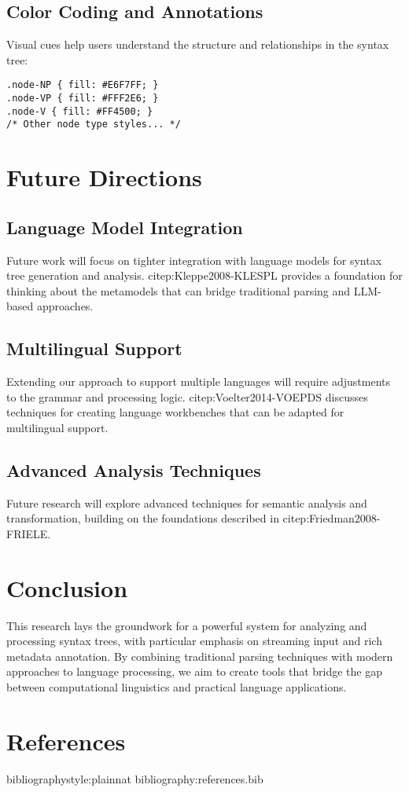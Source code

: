 \documentclass[a4paper,11pt]{article}
\begin{document}
\subsection{Color Coding and Annotations}
\label{sec:org38556ca}

Visual cues help users understand the structure and relationships in the syntax tree:

\begin{verbatim}
.node-NP { fill: #E6F7FF; }
.node-VP { fill: #FFF2E6; }
.node-V { fill: #FF4500; }
/* Other node type styles... */
\end{verbatim}
\section{Future Directions}
\label{sec:org8c8660e}

\subsection{Language Model Integration}
\label{sec:org98bf440}

Future work will focus on tighter integration with language models for syntax tree generation and analysis. citep:Kleppe2008-KLESPL provides a foundation for thinking about the metamodels that can bridge traditional parsing and LLM-based approaches.
\subsection{Multilingual Support}
\label{sec:orgd78245a}

Extending our approach to support multiple languages will require adjustments to the grammar and processing logic. citep:Voelter2014-VOEPDS discusses techniques for creating language workbenches that can be adapted for multilingual support.
\subsection{Advanced Analysis Techniques}
\label{sec:orge14c5d6}

Future research will explore advanced techniques for semantic analysis and transformation, building on the foundations described in citep:Friedman2008-FRIELE.
\section{Conclusion}
\label{sec:org56420dc}

This research lays the groundwork for a powerful system for analyzing and processing syntax trees, with particular emphasis on streaming input and rich metadata annotation. By combining traditional parsing techniques with modern approaches to language processing, we aim to create tools that bridge the gap between computational linguistics and practical language applications.
\section{References}
\label{sec:org5e874b0}



bibliographystyle:plainnat
bibliography:references.bib
\end{document}
